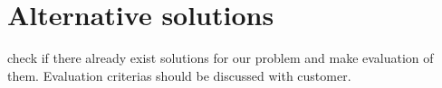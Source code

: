\section{Alternative solutions}
check if there already exist solutions for our problem and make evaluation of them. Evaluation criterias should be discussed with customer. 